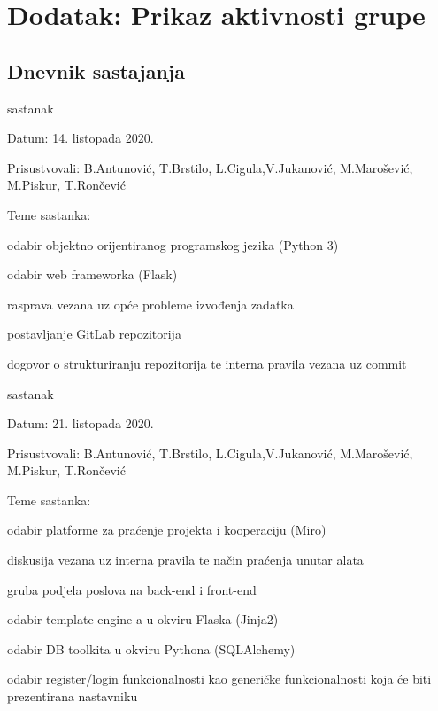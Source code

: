 \chapter*{Dodatak: Prikaz aktivnosti grupe}
		
		\section*{Dnevnik sastajanja}
		\begin{packed_enum}
			\item  sastanak
			
			\item[] \begin{packed_item}
				\item Datum: 14. listopada 2020.
				\item Prisustvovali: B.Antunović, T.Brstilo, L.Cigula,V.Jukanović, M.Marošević, M.Piskur, T.Rončević
				\item Teme sastanka:
				\begin{packed_item}
					\item  odabir objektno orijentiranog programskog jezika (Python 3)
					\item  odabir web frameworka (Flask)
					\item  rasprava vezana uz opće probleme izvođenja zadatka
					\item  postavljanje GitLab repozitorija
					\item  dogovor o strukturiranju repozitorija te interna pravila vezana uz commit
				\end{packed_item}
			\end{packed_item}
			
			\item  sastanak
			\item[] \begin{packed_item}
				\item Datum: 21. listopada 2020.
				\item Prisustvovali: B.Antunović, T.Brstilo, L.Cigula,V.Jukanović, M.Marošević, M.Piskur, T.Rončević
				\item Teme sastanka:
				\begin{packed_item}
					\item  odabir platforme za praćenje projekta i kooperaciju (Miro)
					\item  diskusija vezana uz interna pravila te način praćenja unutar alata
					\item  gruba podjela poslova na back-end i front-end
					\item  odabir template engine-a u okviru Flaska (Jinja2)
					\item  odabir DB toolkita u okviru Pythona (SQLAlchemy)
					\item  odabir register/login funkcionalnosti kao generičke funkcionalnosti koja će biti prezentirana nastavniku
				\end{packed_item}
			\end{packed_item}
			

\end{packed_enum}
